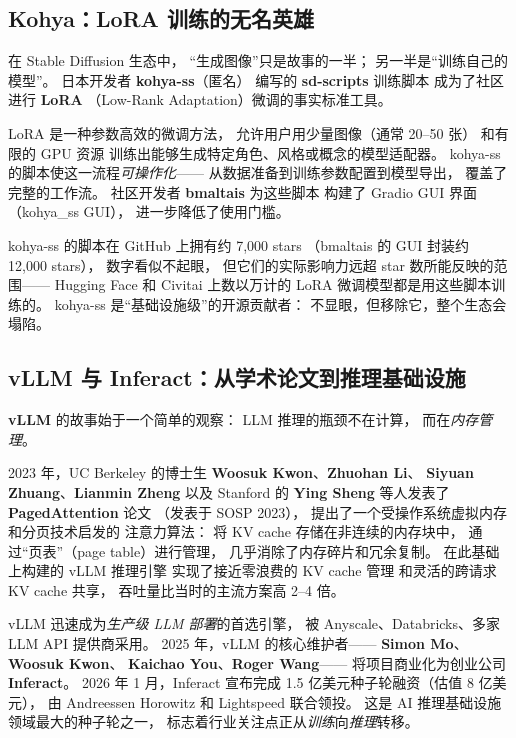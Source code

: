 \subsection{Kohya：LoRA 训练的无名英雄}

在 Stable Diffusion 生态中，
``生成图像''只是故事的一半；
另一半是``训练自己的模型''。
日本开发者 \textbf{kohya-ss}（匿名）
编写的 \textbf{sd-scripts} 训练脚本
成为了社区进行 \textbf{LoRA}
（Low-Rank Adaptation）微调的事实标准工具。

LoRA 是一种参数高效的微调方法，
允许用户用少量图像（通常 20--50 张）
和有限的 GPU 资源
训练出能够生成特定角色、风格或概念的模型适配器。
kohya-ss 的脚本使这一流程\emph{可操作化}——
从数据准备到训练参数配置到模型导出，
覆盖了完整的工作流。
社区开发者 \textbf{bmaltais} 为这些脚本
构建了 Gradio GUI 界面（kohya\_ss GUI），
进一步降低了使用门槛。

kohya-ss 的脚本在 GitHub 上拥有约 7,000 stars
（bmaltais 的 GUI 封装约 12,000 stars），
数字看似不起眼，
但它们的实际影响力远超 star 数所能反映的范围——
Hugging Face 和 Civitai 上数以万计的
LoRA 微调模型都是用这些脚本训练的。
kohya-ss 是``基础设施级''的开源贡献者：
不显眼，但移除它，整个生态会塌陷。

\subsection{vLLM 与 Inferact：从学术论文到推理基础设施}

\textbf{vLLM} 的故事始于一个简单的观察：
LLM 推理的瓶颈不在计算，
而在\emph{内存管理}。

2023 年，UC Berkeley 的博士生
\textbf{Woosuk Kwon}、\textbf{Zhuohan Li}、
\textbf{Siyuan Zhuang}、\textbf{Lianmin Zheng}
以及 Stanford 的 \textbf{Ying Sheng}
等人发表了 \textbf{PagedAttention} 论文
（发表于 SOSP 2023），
提出了一个受操作系统虚拟内存和分页技术启发的
注意力算法：
将 KV cache 存储在非连续的内存块中，
通过``页表''（page table）进行管理，
几乎消除了内存碎片和冗余复制。
在此基础上构建的 vLLM 推理引擎
实现了接近零浪费的 KV cache 管理
和灵活的跨请求 KV cache 共享，
吞吐量比当时的主流方案高 2--4 倍。

vLLM 迅速成为\emph{生产级 LLM 部署}的首选引擎，
被 Anyscale、Databricks、多家 LLM API 提供商采用。
2025 年，vLLM 的核心维护者——
\textbf{Simon Mo}、\textbf{Woosuk Kwon}、
\textbf{Kaichao You}、\textbf{Roger Wang}——
将项目商业化为创业公司 \textbf{Inferact}。
2026 年 1 月，Inferact 宣布完成
1.5 亿美元种子轮融资（估值 8 亿美元），
由 Andreessen Horowitz 和 Lightspeed 联合领投。
这是 AI 推理基础设施领域最大的种子轮之一，
标志着行业关注点正从\emph{训练}向\emph{推理}转移。

